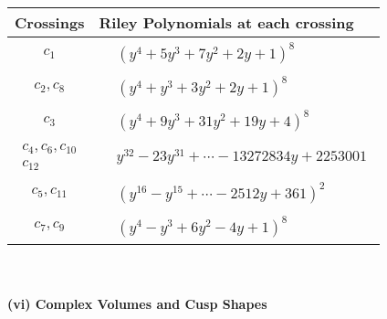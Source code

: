 \documentclass[1p]{elsarticle_modified}
\theoremstyle{definition}
\begin{document}
\begin{tabular}{m{50pt}|m{274pt}}
Crossings & \hspace{64pt}Riley Polynomials at each crossing \\
\hline $$\begin{aligned}c_{1}\end{aligned}$$&$\begin{aligned}
&(y^4+5 y^3+7 y^2+2 y+1)^8
\end{aligned}$\\
\hline $$\begin{aligned}c_{2},c_{8}\end{aligned}$$&$\begin{aligned}
&(y^4+y^3+3 y^2+2 y+1)^8
\end{aligned}$\\
\hline $$\begin{aligned}c_{3}\end{aligned}$$&$\begin{aligned}
&(y^4+9 y^3+31 y^2+19 y+4)^8
\end{aligned}$\\
\hline $$\begin{aligned}c_{4},c_{6},c_{10}\\c_{12}\end{aligned}$$&$\begin{aligned}
&y^{32}-23 y^{31}+\cdots-13272834 y+2253001
\end{aligned}$\\
\hline $$\begin{aligned}c_{5},c_{11}\end{aligned}$$&$\begin{aligned}
&(y^{16}- y^{15}+\cdots-2512 y+361)^{2}
\end{aligned}$\\
\hline $$\begin{aligned}c_{7},c_{9}\end{aligned}$$&$\begin{aligned}
&(y^4- y^3+6 y^2-4 y+1)^8
\end{aligned}$\\
\hline
\end{tabular}\\~\\
\newpage\flushleft \textbf{(vi) Complex Volumes and Cusp Shapes}
\end{document}
